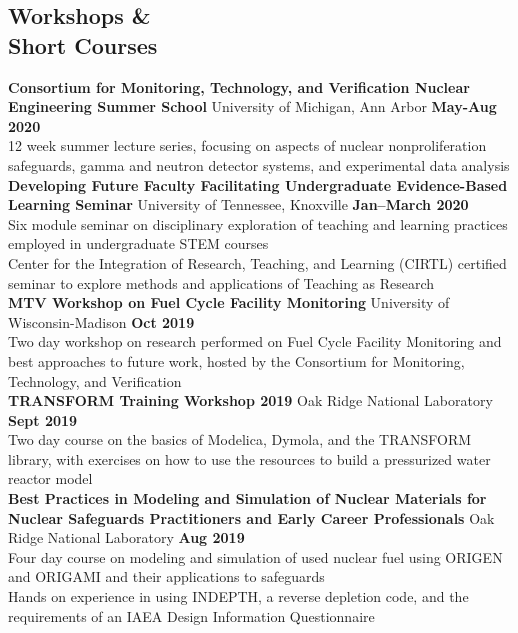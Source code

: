 \documentclass[margin,line]{resume}
\begin{document}
\begin{resume}
    \section{\mysidestyle Workshops \&\\Short Courses}
    \textbf{Consortium for Monitoring, Technology, and Verification Nuclear Engineering Summer School} University of Michigan, Ann Arbor \hfill \textbf{May-Aug 2020} \\
    12 week summer lecture series, focusing on aspects of nuclear nonproliferation safeguards, gamma and neutron detector systems, and experimental data analysis \\
    \textbf{Developing Future Faculty Facilitating Undergraduate Evidence-Based Learning Seminar} University of Tennessee, Knoxville \hfill \textbf{Jan--March 2020} \\
    Six module seminar on disciplinary exploration of teaching and learning practices employed in undergraduate STEM courses \\
    Center for the Integration of Research, Teaching, and Learning (CIRTL) certified seminar to explore methods and applications of Teaching as Research\\
    \textbf{MTV Workshop on Fuel Cycle Facility Monitoring} University of Wisconsin-Madison \hfill \textbf{Oct 2019} \\
    Two day workshop on research performed on Fuel Cycle Facility Monitoring and best approaches to future work, hosted by the Consortium for Monitoring, Technology, and Verification \\
    \textbf{TRANSFORM Training Workshop 2019} Oak Ridge National Laboratory \hfill \textbf{Sept 2019} \\
    Two day course on the basics of Modelica, Dymola, and the TRANSFORM library, with exercises on how to use the resources to build a pressurized water reactor model \\
    \textbf{Best Practices in Modeling and Simulation of Nuclear Materials for Nuclear Safeguards Practitioners and Early Career Professionals} 
    Oak Ridge National Laboratory \hfill \textbf{Aug 2019} \\
    Four day course on modeling and simulation of used nuclear fuel using ORIGEN and ORIGAMI and their applications to safeguards \\
    Hands on experience in using INDEPTH, a reverse depletion code, and the requirements of an IAEA Design Information Questionnaire \\ 
    


\end{resume}
\end{document}
